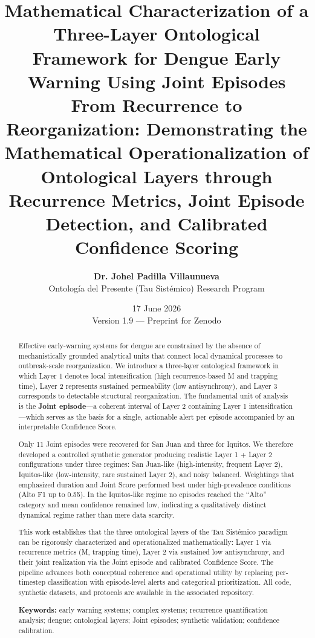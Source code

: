 \documentclass[11pt,a4paper]{article}
\title{\textbf{Mathematical Characterization of a Three-Layer Ontological Framework for Dengue Early Warning Using Joint Episodes}\\[0.35em]
\large From Recurrence to Reorganization: Demonstrating the Mathematical Operationalization of Ontological Layers through Recurrence Metrics, Joint Episode Detection, and Calibrated Confidence Scoring}
\author{
    \textbf{Dr. Johel Padilla Villaunueva} \\[0.25em]
    \small Ontolog\'ia del Presente (Tau Sist\'emico) Research Program
}
\date{17 June 2026 \\ \small Version 1.9 — Preprint for Zenodo}
\begin{document}
\maketitle

\begin{abstract}
\noindent Effective early-warning systems for dengue are constrained by the absence of mechanistically grounded analytical units that connect local dynamical processes to outbreak-scale reorganization. We introduce a three-layer ontological framework in which Layer 1 denotes local intensification (high recurrence-based M and trapping time), Layer 2 represents sustained permeability (low antisynchrony), and Layer 3 corresponds to detectable structural reorganization. The fundamental unit of analysis is the \textbf{Joint episode}—a coherent interval of Layer 2 containing Layer 1 intensification—which serves as the basis for a single, actionable alert per episode accompanied by an interpretable Confidence Score.

Only 11 Joint episodes were recovered for San Juan and three for Iquitos. We therefore developed a controlled synthetic generator producing realistic Layer 1 + Layer 2 configurations under three regimes: San Juan-like (high-intensity, frequent Layer 2), Iquitos-like (low-intensity, rare sustained Layer 2), and noisy balanced. Weightings that emphasized duration and Joint Score performed best under high-prevalence conditions (Alto F1 up to 0.55). In the Iquitos-like regime no episodes reached the ``Alto'' category and mean confidence remained low, indicating a qualitatively distinct dynamical regime rather than mere data scarcity.

This work establishes that the three ontological layers of the Tau Sistémico paradigm can be rigorously characterized and operationalized mathematically: Layer 1 via recurrence metrics (M, trapping time), Layer 2 via sustained low antisynchrony, and their joint realization via the Joint episode and calibrated Confidence Score. The pipeline advances both conceptual coherence and operational utility by replacing per-timestep classification with episode-level alerts and categorical prioritization. All code, synthetic datasets, and protocols are available in the associated repository.

\vspace{0.2em}
\noindent\textbf{Keywords:} early warning systems; complex systems; recurrence quantification analysis; dengue; ontological layers; Joint episodes; synthetic validation; confidence calibration.
\end{abstract}
\end{document}
